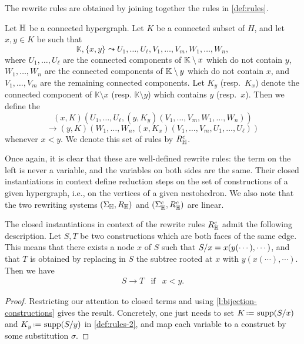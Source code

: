 The rewrite rules are obtained by joining together the rules in \cref{def:rules}. 

\begin{definition} 
  \label{def:rules-2}
  Let ${\mathbb H}$ be a connected hypergraph. 
  Let $K$ be a connected subset of $H$, and let $x,y \in K$ be such that
  $$\mathbb{K},\{x,y\} \leadsto U_1,\ldots,U_\ell,V_1,\ldots,V_m,W_1,\ldots,W_n,$$
  where $U_1,\ldots,U_\ell$ are the connected components of ${\mathbb K} \setminus x$ which do not contain $y$, $W_1,\ldots,W_n$ are the connected components of ${\mathbb K} \setminus y$ which do not contain $x$, and $V_1,\ldots,V_m$ are the remaining connected components. 
  Let $K_y$ (resp.\ $K_x$) denote the connected component of $\mathbb{K} \setminus x$ (resp. $\mathbb{K} \setminus y$) which contains $y$ (resp.\ $x$).
  Then we define the 
  $$(x,K)(U_1,\ldots, U_{\ell},(y,K_y)(V_1,\ldots,V_m,W_1,\ldots,W_n))$$
  $$ \longrightarrow (y,K)(W_1,\ldots,W_n,(x,K_x)(V_1,\ldots,V_m,U_1,\ldots,U_\ell))$$
  whenever $x < y$. 
  We denote this set of rules by $R_{\mathbb H}^c$.
\end{definition} 

Once again, it is clear that these are well-defined rewrite rules: the term on the left is never a variable, and the variables on both sides are the same.
Their closed instantiations in context define reduction steps on the set of constructions of a given hypergraph, i.e., on the vertices of a given nestohedron.  
We also note that the two rewriting systems $(\Sigma_{\mathbb H},R_{\mathbb H})$ and $(\Sigma_{\mathbb H}^c,R_{\mathbb H}^c)$ are linear.

\begin{lemma} 
  \label{l:instantiation-constructions}
  The closed instantiations in context of the rewrite rules $R_{\mathbb H}^c$ admit the following description.
  Let $S,T$ be two constructions which are both faces of the same edge. 
  This means that there exists a node $x$ of $S$ such that $S/x=x(y(\cdots),\cdots)$, and that $T$ is obtained by replacing in $S$ the  subtree rooted at $x$ with $y(x(\cdots),\cdots)$. 
  Then we have
  $$\begin{array}{lll}
    S \to T &  \mathrm{if} & x < y. 
  \end{array}$$
\end{lemma} 

\begin{proof}
  Restricting our attention to closed terms and using \cref{l:bijection-constructions} gives the result. 
  Concretely, one just needs to set $K\eqdef \supp(\occ{S}{x})$ and $K_y\eqdef \supp(\occ{S}{y})$ in \cref{def:rules-2}, and map each variable to a construct by some substitution $\sigma$.
\end{proof}

